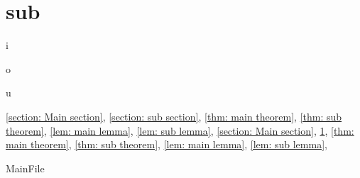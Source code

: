 \documentclass[uplatex,dvipdfmx]{jsarticle}
\begin{document}
\fi
\section{sub}\label{section: sub section}
i
\begin{thm}
  \label{thm: sub theorem}
  o
\end{thm}
\begin{lem}\label{lem: sub lemma}
  u
\end{lem}

\autoref{section: Main section},
\autoref{section: sub section},
\autoref{thm: main theorem},
\autoref{thm: sub theorem},
\autoref{lem: main lemma},
\autoref{lem: sub lemma},
\ref{section: Main section},
\ref{section: sub section},
\ref{thm: main theorem},
\ref{thm: sub theorem},
\ref{lem: main lemma},
\ref{lem: sub lemma},


\cite{Ha}

\ifcsname MainFile\endcsname\else
\printbibliography
\end{document}
